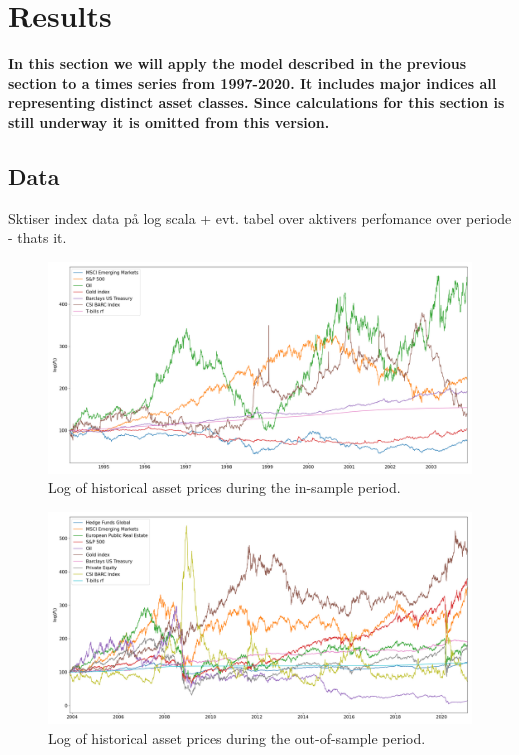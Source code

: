 \section{Results}

\textbf{In this section we will apply the model described in the previous section to a times series from 1997-2020. It includes major indices all representing distinct asset classes. Since calculations for this section is still underway it is omitted from this version.}


\subsection{Data}

Sktiser index data på log scala + evt. tabel over aktivers perfomance over periode - thats it.

\begin{figure}[H]
    \centering
    \includegraphics[width=1\textwidth]{analysis/portfolio_exercise/images/asset_vals_insample.png}
    \caption[Log of historical asset prices during the in-sample period]{Log of historical asset prices during the in-sample period.}
    \label{fig:MPC_data}
\end{figure}


\begin{figure}[H]
    \centering
    \includegraphics[width=1\textwidth]{analysis/portfolio_exercise/images/asset_vals_oos.png}
    \caption[Log of historical asset prices during the out-of-sample period]{Log of historical asset prices during the out-of-sample period.}
    \label{fig:MPC_data}
\end{figure}

